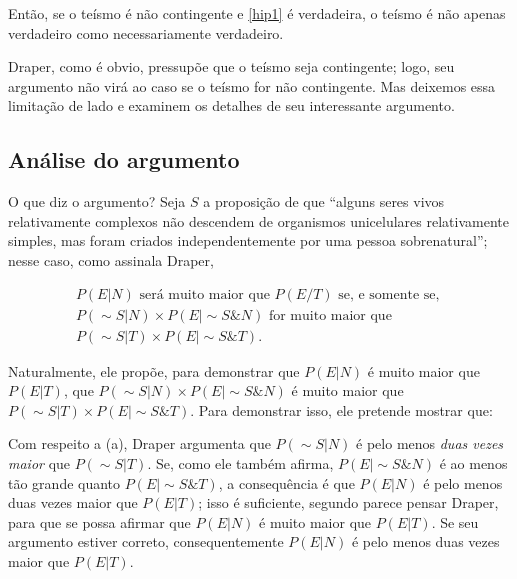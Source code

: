 \documentclass[11pt, a5paper]{exam}
\begin{document}
Então, se o teísmo é não contingente e \eqref{hip1} é verdadeira, o teísmo é não 
apenas verdadeiro como necessariamente verdadeiro. 

Draper, como é obvio, pressupõe que o teísmo seja contingente; logo, seu 
argumento não virá ao caso se o teísmo for não contingente. 
Mas deixemos essa limitação de lado e examinem os detalhes de seu interessante 
argumento.

\subsection{Análise do argumento}

O que diz o argumento? 
Seja $ S $ a proposição de que ``alguns seres vivos relativamente complexos não 
descendem de organismos unicelulares relativamente simples, mas foram criados 
independentemente por uma pessoa sobrenatural''; nesse caso, como assinala 
Draper, 

\begin{equation}\label{hip2}
 \begin{split}
  P(E|N) \text{ será muito maior que } P(E/T) \text{ se, e somente se, }\\
  P(\sim\! S | N) \times P(E|\sim\! S \& N) \text{ for muito maior que } \\
  P(\sim\! S | T) \times P(E | \sim\! S \& T).
 \end{split}
\end{equation}

Naturalmente, ele propõe, para demonstrar que $ P(E|N) $ é muito maior que 
$ P(E|T) $, que $ P(\sim\! S | N) \times P(E | \sim\! S \& N) $ é muito maior que 
$ P(\sim\! S | T) \times P(E | \sim\! S \& T) $.
Para demonstrar isso, ele pretende mostrar que: 


Com respeito a (a), Draper argumenta que $ P(\sim\! S | N) $ é pelo menos
\textit{duas vezes maior} que $ P(\sim\!\!\! S | T) $. 
Se, como ele também afirma, {\small $ P(E |\! \sim\! S\& N) $ } é ao menos tão grande quanto 
$ P(E|\sim\!\! S \& T) $, a consequência é que $ P(E | N) $ é pelo menos duas vezes 
maior que $ P(E | T) $; isso é suficiente, segundo parece pensar Draper, para 
que se possa afirmar que $ P(E | N) $ é muito maior que $ P(E | T) $. 
Se seu argumento estiver correto, consequentemente $ P(E | N) $ é pelo menos 
duas vezes maior que $ P(E|T) $.
\end{document}

